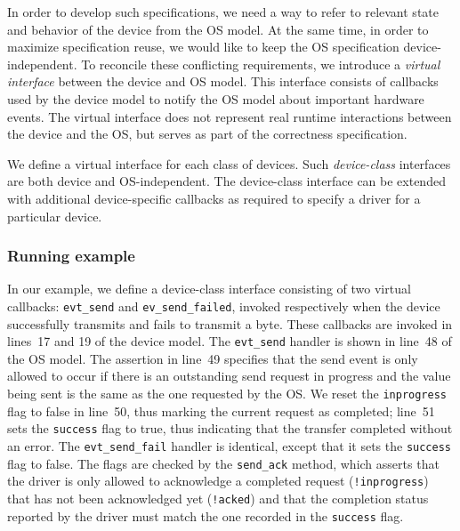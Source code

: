 \documentclass{book}
\theoremstyle{definition}
\newcommand{\src}[1]{\texttt{\small #1}}
\begin{document}
In order to develop such specifications, we need a way to refer to relevant state and behavior of the device from the OS model.  At the same time, in order to maximize specification reuse, we would like to keep the OS specification device-independent.  To reconcile these conflicting requirements, we introduce a \emph{virtual interface} between the device and OS model.  This interface consists of callbacks used by the device model to notify the OS model about important hardware events.  The virtual interface does not represent real runtime interactions between the device and the OS, but serves as part of the correctness specification.

We define a virtual interface for each class of devices.  Such \emph{device-class} interfaces are both device and OS-independent.  The device-class interface can be extended with additional device-specific callbacks as required to specify a driver for a particular device.

\subsubsection{Running example}

In our example, we define a device-class interface consisting of two virtual callbacks: \src{evt\_send} and \src{ev\_send\_failed}, invoked respectively when the device successfully transmits and fails to transmit a byte.  These callbacks are invoked in lines~17 and 19 of the device model.  The \src{evt\_send} handler is shown in line~48 of the OS model.  The assertion in line~49 specifies that the send event is only allowed to occur if there is an outstanding send request in progress and the value being sent is the same as the one requested by the OS.  We reset the \src{inprogress} flag to false in line~50, thus marking the current request as completed; line~51 sets the \src{success} flag to true, thus indicating that the transfer completed without an error.  The \src{evt\_send\_fail} handler is identical, except that it sets the \src{success} flag to false.  The flags are checked by the \src{send\_ack} method, which asserts that the driver is only allowed to acknowledge a completed request (\src{!inprogress}) that has not been acknowledged yet (\src{!acked}) and that the completion status reported by the driver must match the one recorded in the \src{success} flag.
\end{document}
